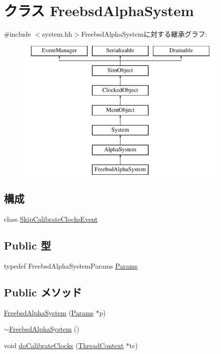 \hypertarget{classFreebsdAlphaSystem}{
\section{クラス FreebsdAlphaSystem}
\label{classFreebsdAlphaSystem}
}


{\ttfamily \#include $<$system.hh$>$}FreebsdAlphaSystemに対する継承グラフ:\begin{figure}[H]
\begin{center}
\leavevmode
\includegraphics[height=7cm]{classFreebsdAlphaSystem}
\end{center}
\end{figure}
\subsection*{構成}
\begin{DoxyCompactItemize}
\item 
class \hyperlink{classFreebsdAlphaSystem_1_1SkipCalibrateClocksEvent}{SkipCalibrateClocksEvent}
\end{DoxyCompactItemize}
\subsection*{Public 型}
\begin{DoxyCompactItemize}
\item 
typedef FreebsdAlphaSystemParams \hyperlink{classFreebsdAlphaSystem_a0cee38b7e957f9f434ee078d80b94d1b}{Params}
\end{DoxyCompactItemize}
\subsection*{Public メソッド}
\begin{DoxyCompactItemize}
\item 
\hyperlink{classFreebsdAlphaSystem_ad506c0b9afe92910dadb260cbc914a79}{FreebsdAlphaSystem} (\hyperlink{classFreebsdAlphaSystem_a0cee38b7e957f9f434ee078d80b94d1b}{Params} $\ast$p)
\item 
\hyperlink{classFreebsdAlphaSystem_aa3f37711630003ea2bb338a3b3fdea06}{$\sim$FreebsdAlphaSystem} ()
\item 
void \hyperlink{classFreebsdAlphaSystem_a7a774b4d4617a0112a06be6f030dc9f5}{doCalibrateClocks} (\hyperlink{classThreadContext}{ThreadContext} $\ast$tc)
\end{DoxyCompactItemize}
